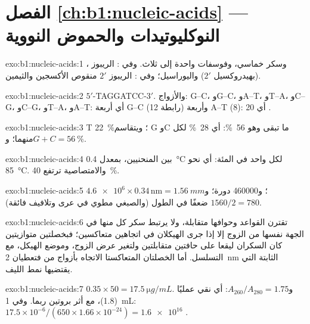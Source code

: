 \section*{الفصل \ref{ch:b1:nucleic-acids} --- النوكليوتيدات والحموض النووية}

\begin{solution}{exo:b1:nucleic-acids:1}
، وسكر خماسي، وفوسفات واحدة إلى ثلاث. وفي : الريبوز
(بهيدروكسيل $2'$) واليوراسيل؛ وفي : الريبوز $2'$ منقوص الأكسجين
والثيمين.
\end{solution}

\begin{solution}{exo:b1:nucleic-acids:2}
$5'$-TAGGATCC-$3'$. والأزواج: G--C، وG--C، وA--T، وT--A، وC--G،
وC--G، وT--A، وA--T: أي أربعة G--C (12 رابطة) وأربعة A--T (8): أي
20 .
\end{solution}

\begin{solution}{exo:b1:nucleic-acids:3}
T \qty{22}{\%}؛ ويتقاسم G وC ما تبقى وهو \qty{56}{\%}: أي
\qty{28}{\%} لكل منهما؛ و$G + C = \qty{56}{\%}$.
\end{solution}

\begin{solution}{exo:b1:nucleic-acids:4}
بين المنحنيين، بمعدل \qty{0.4}{\celsius} لكل واحد في المئة: أي نحو
\qty{85}{\celsius}. والامتصاصية ترتفع \qty{40}{\%}.
\end{solution}

\begin{solution}{exo:b1:nucleic-acids:5}
$\num{4.6e6}\times 0.34\,\mathrm{nm} = \qty{1.56}{mm}$؛ و\num{460000}
دورة؛ و$1560/2 = 780$ ضعفًا في الطول (والصبغي مطوي في عرى وتلافيف
فائقة).
\end{solution}

\begin{solution}{exo:b1:nucleic-acids:6}
تقترن القواعد وحوافها متقابلة، ولا يرتبط سكر كل منها في الجهة نفسها
من الزوج إلا إذا جرى الهيكلان في اتجاهين متعاكسين؛ فبخصلتين متوازيتين
كان السكران ليقعا على حافتين متقابلتين ولتغير عرض الزوج، وموضع
الهيكل، مع التسلسل. أما الخصلتان المتعاكستا الاتجاه بأزواج من 
 فتعطيان \qty{2}{nm} الثابتة التي يقتضيها نمط الليف.
\end{solution}

\begin{solution}{exo:b1:nucleic-acids:7}
$0.35\times 50 = \qty{17.5}{\micro g/mL}$. و$A_{260}/A_{280} = 1.75$:
أي  نقي عمليًا (1.8)، مع أثر بروتين ربما. وفي \qty{1}{mL}:
$17.5\times 10^{-6}/(650\times 1.66\times 10^{-24}) =
\num{1.6e16}$
.
\end{solution}

